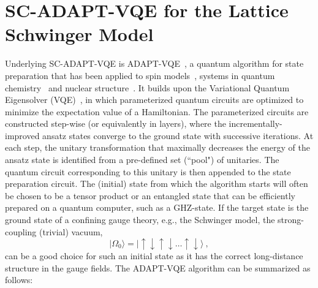 \documentclass[aps, pra, onecolumn, tightenlines, letterpaper, amsmath, amssymb, preprintnumbers, floatfix, longbibliography, nofootinbib]{revtex4-2}
\begin{document}
\FloatBarrier
\section{SC-ADAPT-VQE for the Lattice Schwinger Model}
\label{sec:II}
\noindent
Underlying SC-ADAPT-VQE is ADAPT-VQE~\cite{Grimsley_2019},  
a quantum algorithm for state preparation that has been applied to spin models~\cite{VanDyke:2022ffj}, systems in quantum chemistry~\cite{Grimsley_2019,Tang:2021PRX,Yordanov:2021,Shkolnikov:2021btx,Bertels:2022oga,Anastasiou:2022swg,Feniou:2023gvo} and nuclear structure~\cite{Romero:2022blx,Perez-Obiol:2023vod}.
It builds upon the Variational Quantum Eigensolver (VQE)~\cite{Peruzzo_2014}, 
in which parameterized quantum circuits are optimized  
to minimize the expectation value of a Hamiltonian.
The parameterized circuits are constructed 
step-wise (or equivalently in layers), 
where the incrementally-improved ansatz states converge to the ground state with successive iterations.
At each step, 
the unitary transformation that maximally decreases the energy of the ansatz state is identified from a pre-defined set (``pool") of unitaries.
The quantum circuit corresponding to this unitary is then
appended to the state preparation circuit. 
The (initial) state from which the algorithm starts
will often be chosen to be a tensor product
or an entangled state that can be efficiently prepared on a quantum computer, 
such as a GHZ-state.
If the target state is the ground state of a confining gauge theory, e.g., the Schwinger model, 
the strong-coupling (trivial) vacuum,
%
\begin{equation}
|\Omega_0\rangle = 
\lvert\uparrow\downarrow\uparrow\downarrow \ldots\uparrow\downarrow\rangle
\ ,
\label{eq:SCvac}
\end{equation} 
%
can be a good choice for such an initial state as it has the correct long-distance 
structure in the gauge fields.
The ADAPT-VQE algorithm can be summarized as follows:
%
\end{document}
